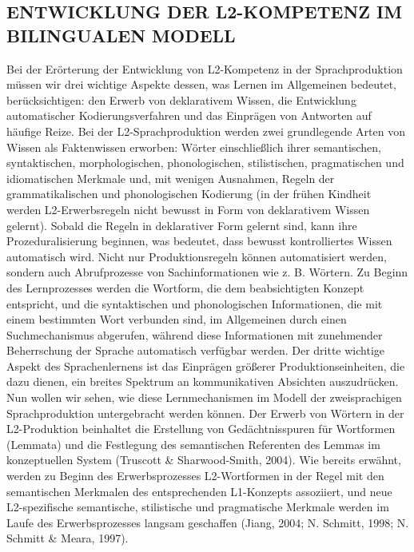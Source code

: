 \documentclass[
  letterpaper,
]{scrbook}
\begin{document}
\hypertarget{entwicklung-der-l2-kompetenz-im-bilingualen-modell}{%
\subsection{ENTWICKLUNG DER L2-KOMPETENZ IM BILINGUALEN
MODELL}\label{entwicklung-der-l2-kompetenz-im-bilingualen-modell}}

Bei der Erörterung der Entwicklung von L2-Kompetenz in der
Sprachproduktion müssen wir drei wichtige Aspekte dessen, was Lernen im
Allgemeinen bedeutet, berücksichtigen: den Erwerb von deklarativem
Wissen, die Entwicklung automatischer Kodierungsverfahren und das
Einprägen von Antworten auf häufige Reize. Bei der L2-Sprachproduktion
werden zwei grundlegende Arten von Wissen als Faktenwissen erworben:
Wörter einschließlich ihrer semantischen, syntaktischen,
morphologischen, phonologischen, stilistischen, pragmatischen und
idiomatischen Merkmale und, mit wenigen Ausnahmen, Regeln der
grammatikalischen und phonologischen Kodierung (in der frühen Kindheit
werden L2-Erwerbsregeln nicht bewusst in Form von deklarativem Wissen
gelernt). Sobald die Regeln in deklarativer Form gelernt sind, kann ihre
Prozeduralisierung beginnen, was bedeutet, dass bewusst kontrolliertes
Wissen automatisch wird. Nicht nur Produktionsregeln können
automatisiert werden, sondern auch Abrufprozesse von Sachinformationen
wie z. B. Wörtern. Zu Beginn des Lernprozesses werden die Wortform, die
dem beabsichtigten Konzept entspricht, und die syntaktischen und
phonologischen Informationen, die mit einem bestimmten Wort verbunden
sind, im Allgemeinen durch einen Suchmechanismus abgerufen, während
diese Informationen mit zunehmender Beherrschung der Sprache automatisch
verfügbar werden. Der dritte wichtige Aspekt des Sprachenlernens ist das
Einprägen größerer Produktionseinheiten, die dazu dienen, ein breites
Spektrum an kommunikativen Absichten auszudrücken. Nun wollen wir sehen,
wie diese Lernmechanismen im Modell der zweisprachigen Sprachproduktion
untergebracht werden können. Der Erwerb von Wörtern in der L2-Produktion
beinhaltet die Erstellung von Gedächtnisspuren für Wortformen (Lemmata)
und die Festlegung des semantischen Referenten des Lemmas im
konzeptuellen System (Truscott \& Sharwood-Smith, 2004). Wie bereits
erwähnt, werden zu Beginn des Erwerbsprozesses L2-Wortformen in der
Regel mit den semantischen Merkmalen des entsprechenden L1-Konzepts
assoziiert, und neue L2-spezifische semantische, stilistische und
pragmatische Merkmale werden im Laufe des Erwerbsprozesses langsam
geschaffen (Jiang, 2004; N. Schmitt, 1998; N. Schmitt \& Meara, 1997).
\end{document}
